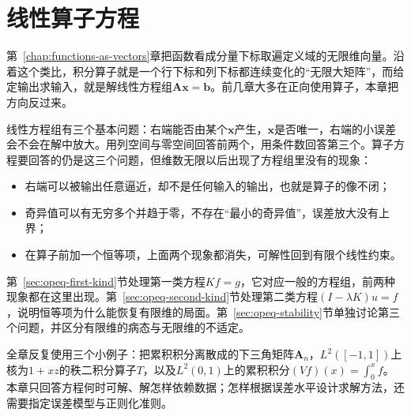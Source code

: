 \chapter{线性算子方程}
\label{chap:linear-operator-equations}

第~\ref{chap:functions-as-vectors}章把函数看成分量下标取遍定义域的无限维向量。沿着这个类比，积分算子就是一个行下标和列下标都连续变化的“无限大矩阵”，而给定输出求输入，就是解线性方程组$\bm A\bm x=\bm b$。前几章大多在正向使用算子，本章把方向反过来。

线性方程组有三个基本问题：右端能否由某个$\bm x$产生，$\bm x$是否唯一，右端的小误差会不会在解中放大。用列空间与零空间回答前两个，用条件数回答第三个。算子方程要回答的仍是这三个问题，但维数无限以后出现了方程组里没有的现象：
\begin{itemize}
  \item 右端可以被输出任意逼近，却不是任何输入的输出，也就是算子的像不闭；
  \item 奇异值可以有无穷多个并趋于零，不存在“最小的奇异值”，误差放大没有上界；
  \item 在算子前加一个恒等项，上面两个现象都消失，可解性回到有限个线性约束。
\end{itemize}

第~\ref{sec:opeq-first-kind}节处理第一类方程$Kf=g$，它对应一般的方程组，前两种现象都在这里出现。第~\ref{sec:opeq-second-kind}节处理第二类方程$(I-\lambda K)u=f$，说明恒等项为什么能恢复有限维的局面。第~\ref{sec:opeq-stability}节单独讨论第三个问题，并区分有限维的病态与无限维的不适定。

全章反复使用三个小例子：把累积积分离散成的下三角矩阵$\bm A_n$，$L^2([-1,1])$上核为$1+xz$的秩二积分算子$T$，以及$L^2(0,1)$上的累积积分$(Vf)(x)=\int_0^xf$。本章只回答方程何时可解、解怎样依赖数据；怎样根据误差水平设计求解方法，还需要指定误差模型与正则化准则。





